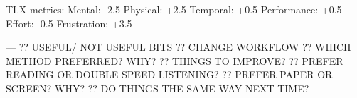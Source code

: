 TLX metrics:
Mental: -2.5
Physical: +2.5
Temporal: +0.5
Performance: +0.5
Effort: -0.5
Frustration: +3.5

---
?? USEFUL/ NOT USEFUL BITS
?? CHANGE WORKFLOW
?? WHICH METHOD PREFERRED? WHY?
?? THINGS TO IMPROVE?
?? PREFER READING OR DOUBLE SPEED LISTENING?
?? PREFER PAPER OR SCREEN? WHY?
?? DO THINGS THE SAME WAY NEXT TIME?

